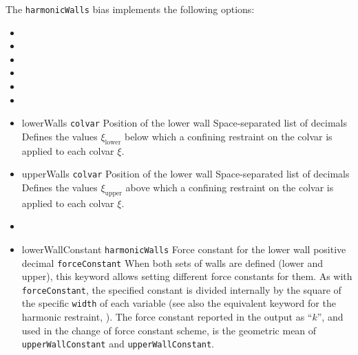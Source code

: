 The \texttt{harmonicWalls} bias implements the following options:
\begin{itemize}
\item {}
\item {}
\item {}
\item {}
\item {}
\item {}

\item %
  \key
    {lowerWalls}{%
    \texttt{colvar}}{%
    Position of the lower wall}{%
    Space-separated list of decimals}{%
    Defines the values $\xi_{\mathrm{lower}}$ below which a confining restraint on the colvar is applied to each colvar $\xi$.}

\item %
  \key
    {upperWalls}{%
    \texttt{colvar}}{%
    Position of the lower wall}{%
    Space-separated list of decimals}{%
    Defines the values $\xi_{\mathrm{upper}}$ above which a confining restraint on the colvar is applied to each colvar $\xi$.}

\item {}

\item %
  \keydef
    {lowerWallConstant}{%
    \texttt{harmonicWalls}}{%
    Force constant for the lower wall}{%
    positive decimal}{%
    \texttt{forceConstant}}{%
    When both sets of walls are defined (lower and upper), this keyword allows setting different force constants for them.
    As with \texttt{forceConstant}, the specified constant is divided internally by the square of the specific \texttt{width} of each variable (see also the equivalent keyword for the harmonic restraint, ).
    The force constant reported in the output as ``$k$'', and used in the change of force constant scheme, is the geometric mean of \texttt{upperWallConstant} and \texttt{upperWallConstant}.
  }


\end{itemize}
